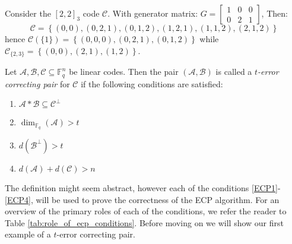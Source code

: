 \begin{example}\label{exmp:shortening_example}
  Consider the $[2, 2]_{3}$ code $\mathcal{C}$. With generator matrix: $G = \begin{bmatrix} 1 & 0 & 0 \\ 0 & 2 & 1 \end{bmatrix}$, Then:
  \begin{equation*}
    \mathcal{C} = \left\{(0, 0), (0, 2, 1), (0, 1, 2), (1, 2, 1), (1, 1, 2), (2, 1, 2)\right\}
  \end{equation*}
  hence $\mathcal{C}(\{1\}) = \left\{(0, 0, 0), (0, 2, 1), (0, 1, 2)\right\}$ while $\mathcal{C}_{\{2, 3\}} = \left\{(0, 0), (2, 1), (1, 2)\right\}$.
\end{example}
\begin{definition}
  Let $\mathcal{A}, \mathcal{B}, \mathcal{C} \subseteq \mathbb{F}_q^n$ be linear codes. Then the pair $(\mathcal{A}, \mathcal{B})$ is called a \textit{$t$-error correcting pair} for $\mathcal{C}$ if the following conditions are satisfied:
  \begin{enumerate}[label=(ECP\arabic*), leftmargin=*]
    \item $\mathcal{A} * \mathcal{B} \subseteq \mathcal{C}^{\perp}$ \label{ECP1}
    \item $\dim_{\mathbb{F}_q}(\mathcal{A}) > t$ \label{ECP2}
    \item $d(\mathcal{B}^{\perp}) > t$ \label{ECP3}
    \item $d(\mathcal{A}) + d(\mathcal{C}) > n$ \label{ECP4}
  \end{enumerate}
\end{definition}
The definition might seem abstract, however each of the conditions \ref{ECP1}-\ref{ECP4}, will be used to prove the correctness of the ECP algorithm. For an overview of the primary roles of each of the conditions, we refer the reader to Table \ref{tab:role_of_ecp_conditions}. Before moving on we will show our first example of a $t$-error correcting pair.


